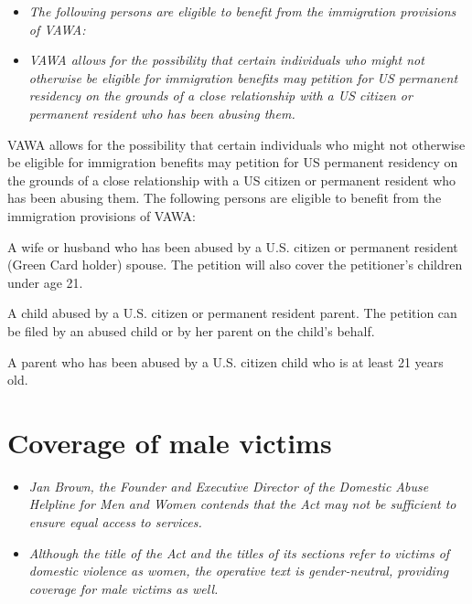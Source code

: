\begin{itemize}
\item
  \emph{The following persons are eligible to benefit from the
  immigration provisions of VAWA:}
\item
  \emph{VAWA allows for the possibility that certain individuals who
  might not otherwise be eligible for immigration benefits may petition
  for US permanent residency on the grounds of a close relationship with
  a US citizen or permanent resident who has been abusing them.}
\end{itemize}

VAWA allows for the possibility that certain individuals who might not
otherwise be eligible for immigration benefits may petition for US
permanent residency on the grounds of a close relationship with a US
citizen or permanent resident who has been abusing them. The following
persons are eligible to benefit from the immigration provisions of VAWA:

A wife or husband who has been abused by a U.S. citizen or permanent
resident (Green Card holder) spouse. The petition will also cover the
petitioner's children under age 21.

A child abused by a U.S. citizen or permanent resident parent. The
petition can be filed by an abused child or by her parent on the child's
behalf.

A parent who has been abused by a U.S. citizen child who is at least 21
years old.

\section{Coverage of male victims}\label{coverage-of-male-victims}

\begin{itemize}
\item
  \emph{Jan Brown, the Founder and Executive Director of the Domestic
  Abuse Helpline for Men and Women contends that the Act may not be
  sufficient to ensure equal access to services.}
\item
  \emph{Although the title of the Act and the titles of its sections
  refer to victims of domestic violence as women, the operative text is
  gender-neutral, providing coverage for male victims as well.}
\end{itemize}

